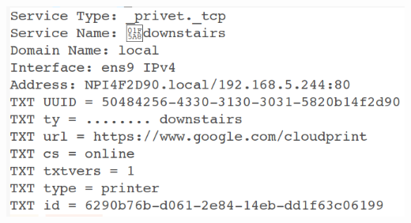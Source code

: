 \documentclass[aspectratio=169]{beamer}
\begin{document}
\begin{frame}[fragile]
  \begin{center}
    \includegraphics[scale=0.6]{mdns-record}
  \end{center}
\end{frame}
\end{document}
